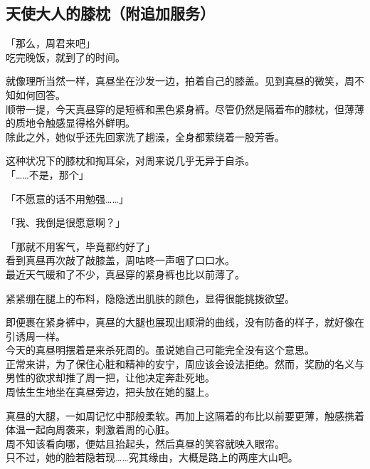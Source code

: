 \subsection{天使大人的膝枕（附追加服务）}

「那么，周君来吧」\\

吃完晚饭，就到了的时间。

就像理所当然一样，真昼坐在沙发一边，拍着自己的膝盖。见到真昼的微笑，周不知如何回答。\\

顺带一提，今天真昼穿的是短裤和黑色紧身裤。尽管仍然是隔着布的膝枕，但薄薄的质地令触感显得格外鲜明。\\

除此之外，她似乎还先回家洗了趟澡，全身都萦绕着一股芳香。

这种状况下的膝枕和掏耳朵，对周来说几乎无异于自杀。\\

「……不是，那个」

「不愿意的话不用勉强……」

「我、我倒是很愿意啊？」

「那就不用客气，毕竟都约好了」\\

看到真昼再次敲了敲膝盖，周咕咚一声咽了口口水。\\

最近天气暖和了不少，真昼穿的紧身裤也比以前薄了。

紧紧绷在腿上的布料，隐隐透出肌肤的颜色，显得很能挑拨欲望。

即便裹在紧身裤中，真昼的大腿也展现出顺滑的曲线，没有防备的样子，就好像在引诱周一样。\\

今天的真昼明摆着是来杀死周的。虽说她自己可能完全没有这个意思。\\

正常来讲，为了保住心脏和精神的安宁，周应该会设法拒绝。然而，奖励的名义与男性的欲求却推了周一把，让他决定奔赴死地。\\

周怯生生地坐在真昼旁边，把头放在她的腿上。

真昼的大腿，一如周记忆中那般柔软。再加上这隔着的布比以前要更薄，触感携着体温一起向周袭来，刺激着周的心脏。\\

周不知该看向哪，便姑且抬起头，然后真昼的笑容就映入眼帘。\\

只不过，她的脸若隐若现……究其缘由，大概是路上的两座大山吧。\\

